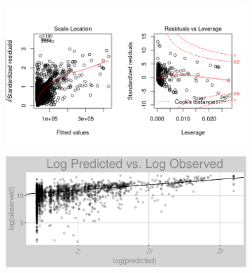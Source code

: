 \begin{figure}[h]
\centering
\begin{subfigure}{1\textwidth}
\centering
\includegraphics[width=.99\textwidth, height=0.475\textheight]{Images/natural_gas_psf_rfe_res_2.png}
\end{subfigure}
\begin{subfigure}{1\textwidth}
\centering
\includegraphics[width=.99\textwidth, height=0.3\textheight]{Images/natural_gas_psf_rfe_pvo.png}
\end{subfigure}
\end{figure}
\FloatBarrier
\newpage
